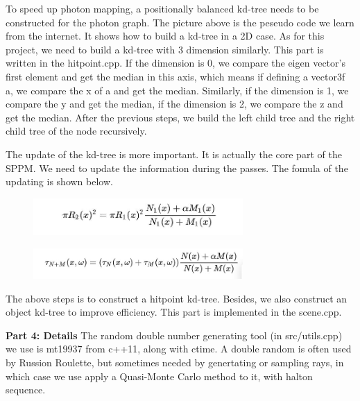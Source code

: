 \documentclass[acmtog]{acmart}
\begin{document}
To speed up photon mapping, a positionally balanced kd-tree needs to be constructed for the photon graph.
The picture above is the peseudo code we learn from the internet. It shows how to build a kd-tree in a 2D case.
As for this project, we need to build a kd-tree with 3 dimension similarly. This part is written in the hitpoint.cpp.
If the dimension is 0, we compare the eigen vector's first element and get the median in this axis, which means if defining a vector3f a, we compare the x of a and get the median. Similarly, if the dimension is 1, we compare the y and get the median, if the dimension is 2, we compare the z and get the median. 
After the previous steps, we build the left child tree and the right child tree of the node recursively.

The update of the kd-tree is more important. It is actually the core part of the SPPM. We need to update the information during the passes.
The fomula of the updating is shown below. 
\begin{figure}[h]
	\centering
	{\includegraphics[width=8cm]{r.JPG}}	
\end{figure}
\begin{figure}[h]
	\centering
	{\includegraphics[width=8cm]{t.JPG}}	
\end{figure}

The above steps is to construct a hitpoint kd-tree. Besides, we also construct an object kd-tree to improve efficiency. 
This part is implemented in the scene.cpp.

\quad \textbf{Part 4: Details}
The random double number generating tool (in src/utils.cpp) we use is mt19937 from c++11, along with ctime. A double random is often used by Russion Roulette, but sometimes needed by genertating or sampling rays, in which case we use apply a Quasi-Monte Carlo method to it, with halton sequence.
\end{document}
